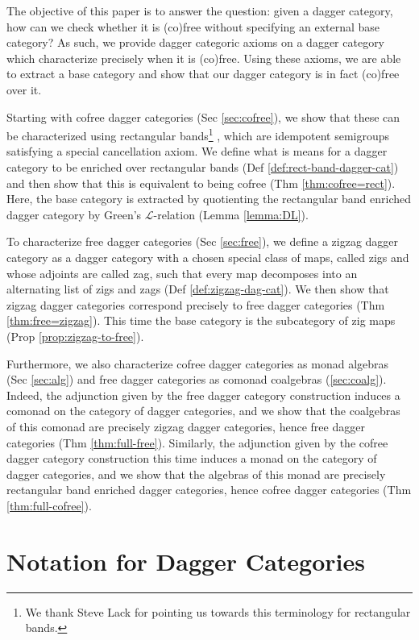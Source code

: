 \documentclass[10pt]{article}
\begin{document}
The objective of this paper is to answer the question: given a dagger category, how can we check whether it is (co)free without specifying an external base category? As such, we provide dagger categoric axioms on a dagger category which characterize precisely when it is (co)free. Using these axioms, we are able to extract a base category and show that our dagger category is in fact (co)free over it. 

Starting with cofree dagger categories (Sec \ref{sec:cofree}), we show that these can be characterized using rectangular bands\footnote{We thank Steve Lack for pointing us towards this terminology for rectangular bands.} \cite{clifford1954bands,kimura1958structure}, which are idempotent semigroups satisfying a special cancellation axiom. We define what is means for a dagger category to be enriched over rectangular bands (Def \ref{def:rect-band-dagger-cat}) and then show that this is equivalent to being cofree (Thm \ref{thm:cofree=rect}). Here, the base category is extracted by quotienting the rectangular band enriched dagger category by Green's $\mathcal{L}$-relation (Lemma \ref{lemma:DL}). 

To characterize free dagger categories (Sec \ref{sec:free}), we define a zigzag dagger category as a dagger category with a chosen special class of maps, called zigs and whose adjoints are called zag, such that every map decomposes into an alternating list of zigs and zags (Def \ref{def:zigzag-dag-cat}). We then show that zigzag dagger categories correspond precisely to free dagger categories (Thm \ref{thm:free=zigzag}). This time the base category is the subcategory of zig maps (Prop \ref{prop:zigzag-to-free}). 

Furthermore, we also characterize cofree dagger categories as monad algebras (Sec \ref{sec:alg}) and free dagger categories as comonad coalgebras (\ref{sec:coalg}). Indeed, the adjunction given by the free dagger category construction induces a comonad on the category of dagger categories, and we show that the coalgebras of this comonad are precisely zigzag dagger categories, hence free dagger categories (Thm \ref{thm:full-free}). Similarly, the adjunction given by the cofree dagger category construction this time induces a monad on the category of dagger categories, and we show that the algebras of this monad are precisely rectangular band enriched dagger categories, hence cofree dagger categories (Thm \ref{thm:full-cofree}). 

\section{Notation for Dagger Categories}
\end{document}
